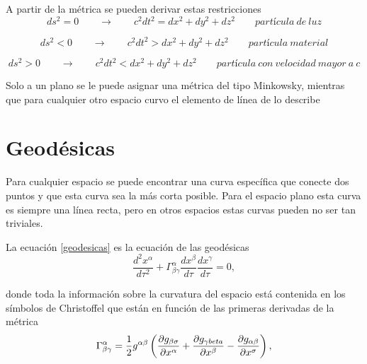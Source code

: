 \documentclass[11pt]{book}
\begin{document}
A partir de la métrica se pueden derivar estas restricciones
\begin{equation} 
ds^2=0 \qquad \to \qquad c^2dt^2=dx^2+dy^2+dz^2 \qquad partícula~ de~ luz 
\end{equation}

\begin{equation}
ds^2<0 \qquad \to \qquad c^2dt^2>dx^2+dy^2+dz^2 \qquad partícula~material
\end{equation}

\begin{equation}
ds^2>0 \qquad \to \qquad c^2dt^2<dx^2+dy^2+dz^2 \qquad partícula~con~velocidad~mayor ~a~c
\end{equation}

Solo a un plano se le puede asignar una métrica del tipo Minkowsky, mientras que para cualquier otro espacio curvo el elemento de línea de lo describe


\section{Geodésicas}

Para cualquier espacio se puede encontrar una curva específica que conecte dos puntos y que esta curva sea la más corta posible. Para el espacio plano esta curva es siempre una línea recta, pero en otros espacios estas curvas pueden no ser tan triviales.

La ecuación \ref{geodesicas} es la ecuación de las geodésicas 
\begin{equation}
\frac{d^2x^\alpha}{d\tau^2}+\Gamma^\alpha_{\beta \gamma} \frac{dx^\beta}{d\tau}\frac{dx^\gamma}{d\tau}=0,
\label{geodesicas}
\end{equation}

donde toda la información sobre la curvatura del espacio está contenida en los símbolos de Christoffel que están en función de las primeras derivadas de la métrica
\begin{equation}
\Gamma^\alpha_{\beta \gamma}=\frac{1}{2}g^{\alpha \beta} \left( \frac{\partial g_{\beta \sigma}}{\partial x^\alpha} + \frac{\partial g_{\gamma \\beta}}{\partial x^\beta} - \frac{\partial g_{\alpha \beta}}{\partial x^\sigma} \right),
\label{christoffel}
\end{equation}
\end{document}
